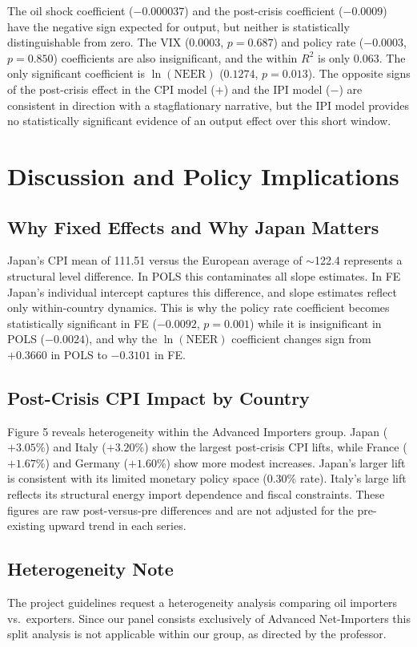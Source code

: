 \documentclass[11pt,a4paper]{article}
\let\oldsection\section
\renewcommand{\section}{\Needspace{6\baselineskip}\oldsection}
\begin{document}
The oil shock coefficient ($-0.000037$) and the post-crisis coefficient ($-0.0009$) have the negative sign expected for output, but neither is statistically distinguishable from zero. The VIX ($0.0003$, $p=0.687$) and policy rate ($-0.0003$, $p=0.850$) coefficients are also insignificant, and the within $R^2$ is only 0.063. The only significant coefficient is $\ln(\text{NEER})$ ($0.1274$, $p=0.013$). The opposite signs of the post-crisis effect in the CPI model ($+$) and the IPI model ($-$) are consistent in direction with a stagflationary narrative, but the IPI model provides no statistically significant evidence of an output effect over this short window.

\section{Discussion and Policy Implications}
\subsection{Why Fixed Effects and Why Japan Matters}
Japan's CPI mean of 111.51 versus the European average of $\sim$122.4 represents a structural level difference. In POLS this contaminates all slope estimates. In FE Japan's individual intercept captures this difference, and slope estimates reflect only within-country dynamics. This is why the policy rate coefficient becomes statistically significant in FE ($-0.0092$, $p=0.001$) while it is insignificant in POLS ($-0.0024$), and why the $\ln(\text{NEER})$ coefficient changes sign from $+0.3660$ in POLS to $-0.3101$ in FE.

\subsection{Post-Crisis CPI Impact by Country}
Figure 5 reveals heterogeneity within the Advanced Importers group. Japan ($+3.05\%$) and Italy ($+3.20\%$) show the largest post-crisis CPI lifts, while France ($+1.67\%$) and Germany ($+1.60\%$) show more modest increases. Japan's larger lift is consistent with its limited monetary policy space (0.30\% rate). Italy's large lift reflects its structural energy import dependence and fiscal constraints. These figures are raw post-versus-pre differences and are not adjusted for the pre-existing upward trend in each series.

\subsection{Heterogeneity Note}
The project guidelines request a heterogeneity analysis comparing oil importers vs.\ exporters. Since our panel consists exclusively of Advanced Net-Importers this split analysis is not applicable within our group, as directed by the professor.
\end{document}
